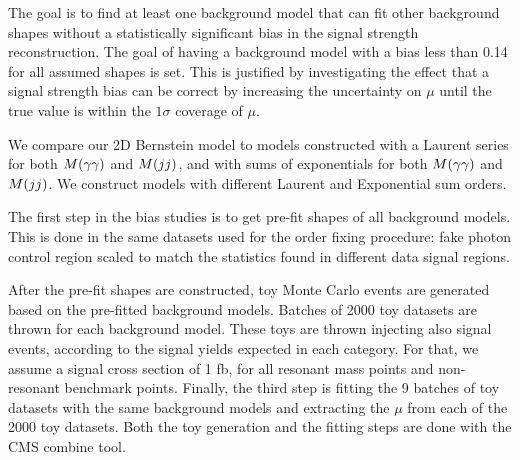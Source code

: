 The goal is to find at least one background model that can fit other background shapes without a statistically significant bias in the signal strength reconstruction. The goal of having a background model with a bias less than 0.14 for all assumed shapes is set. This is justified by investigating the effect that a signal strength bias can be correct by increasing the uncertainty on $\mu$ until the true value is within the $1\sigma$ coverage of $\mu$. 

We compare our 2D Bernstein model to models constructed with a Laurent series for both $M(\gamma\gamma)$ and $M(jj)$, and with sums of exponentials for both $M(\gamma\gamma)$ and $M(jj)$. 
We construct models with different Laurent and Exponential sum orders. 

The first step in the bias studies is to get pre-fit shapes of all background models. 
This is done in the same datasets used for the order fixing procedure: fake photon control region scaled to match the statistics found in different data signal regions. 

After the pre-fit shapes are constructed, toy Monte Carlo events are generated based on the pre-fitted background models. Batches of 2000 toy datasets are thrown for each background model. These toys are thrown injecting also signal events, according to the signal yields expected in each category. For that, we assume a signal cross section of 1 fb, for all resonant mass points and non-resonant benchmark points. Finally, the third step is fitting the 9 batches of toy datasets with the same background models and extracting the $\mu$ from each of the 2000 toy datasets. Both the toy generation and the fitting steps are done with the CMS combine tool.

